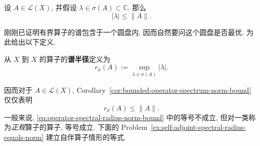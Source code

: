 \begin{Corollary}
\label{cor:bounded-operator-spectrum-norm-bound}
设 $A\in\mathcal{L}(X)$, 并假设 $\lambda\in\sigma(A)\subset\mathbb{C}$. 那么
\begin{equation}\label{eq:bounded-operator-spectrum-norm-bound}
|\lambda|\leq\|A\|.
\end{equation}

\end{Corollary}

\begingroup
{}
\renewcommand{\endProof}{\par\nobreak\hfill$\blacksquare$\par\vspace{0.1cm}}
\endgroup

刚刚已证明有界算子的谱包含于一个圆盘内, 因而自然要问这个圆盘是否最优. 为此给出以下定义.

\begin{Definition}
\label{def:operator-spectral-radius}
从 $X$ 到 $X$ 的算子的\textbf{谱半径}定义为
\begin{equation}\label{eq:operator-spectral-radius-definition}
r_\sigma(A):=\sup_{\lambda\in\sigma(A)}|\lambda|.
\end{equation}

\end{Definition}

因而对于 $A\in\mathcal{L}(X)$, Corollary~\ref{cor:bounded-operator-spectrum-norm-bound} 仅仅表明
\begin{equation}\label{eq:operator-spectral-radius-norm-bound}
r_\sigma(A)\leq\|A\|.
\end{equation}
一般来说, \eqref{eq:operator-spectral-radius-norm-bound} 中的等号不成立, 但对一类称为\emph{正规}算子的算子, 等号成立. 下面的 Problem~\ref{ex:self-adjoint-spectral-radius-equals-norm} 建立自伴算子情形的等式.
